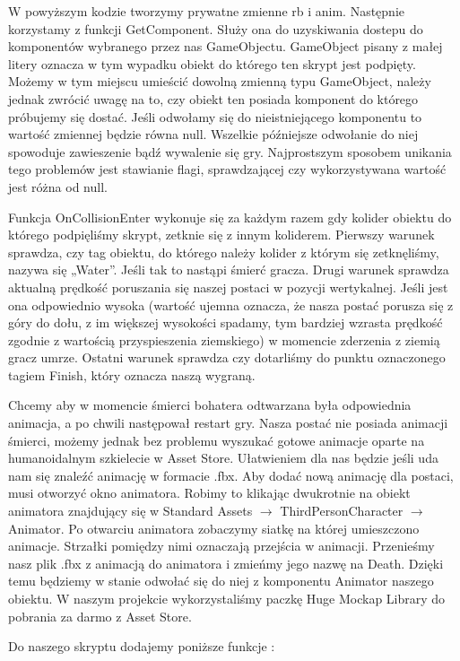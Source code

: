 \documentclass[brudnopis]{xmgr}
\begin{document}
W powyższym kodzie tworzymy prywatne zmienne rb i anim. Następnie korzystamy z funkcji GetComponent. Służy ona do uzyskiwania dostepu do komponentów wybranego przez nas GameObjectu. GameObject pisany z małej litery oznacza w tym wypadku obiekt do którego ten skrypt jest podpięty. Możemy w tym miejscu umieścić dowolną zmienną typu GameObject, należy jednak zwrócić uwagę na to, czy obiekt ten posiada komponent do którego próbujemy się dostać. Jeśli odwołamy się do nieistniejącego komponentu to wartość zmiennej będzie równa null. Wszelkie późniejsze odwołanie do niej spowoduje zawieszenie bądź wywalenie się gry. Najprostszym sposobem unikania tego problemów jest stawianie flagi, sprawdzającej czy wykorzystywana wartość jest różna od null.

Funkcja OnCollisionEnter wykonuje się za każdym razem gdy kolider obiektu do którego podpięliśmy skrypt, zetknie się z innym koliderem. Pierwszy warunek sprawdza, czy tag obiektu, do którego należy kolider z którym się zetknęliśmy, nazywa się „Water”. Jeśli tak to nastąpi śmierć gracza. Drugi warunek sprawdza aktualną prędkość poruszania się naszej postaci w pozycji wertykalnej. Jeśli jest ona odpowiednio wysoka (wartość ujemna oznacza, że nasza postać porusza się z góry do dołu, z im większej wysokości spadamy, tym bardziej wzrasta prędkość zgodnie z wartością przyspieszenia ziemskiego) w momencie zderzenia z ziemią gracz umrze. Ostatni warunek sprawdza czy dotarliśmy do punktu oznaczonego tagiem Finish, który oznacza naszą wygraną.

Chcemy aby w momencie śmierci bohatera odtwarzana była odpowiednia animacja, a po chwili następował restart gry. Nasza postać nie posiada animacji śmierci, możemy jednak bez problemu wyszukać gotowe animacje oparte na humanoidalnym szkielecie w Asset Store. Ułatwieniem dla nas będzie jeśli uda nam się znaleźć animację w formacie .fbx. Aby dodać nową animację dla postaci, musi otworzyć okno animatora. Robimy to klikając dwukrotnie na obiekt animatora znajdujący się w Standard Assets $\rightarrow$ ThirdPersonCharacter $\rightarrow$ Animator. Po otwarciu animatora zobaczymy siatkę na której umieszczono animacje. Strzałki pomiędzy nimi oznaczają przejścia w animacji. Przenieśmy nasz plik .fbx z animacją do animatora i zmieńmy jego nazwę na Death. Dzięki temu będziemy w stanie odwołać się do niej z komponentu Animator naszego obiektu.
W naszym projekcie wykorzystaliśmy paczkę Huge Mockap Library do pobrania za darmo z Asset Store.

Do naszego skryptu dodajemy poniższe funkcje :
\end{document}
